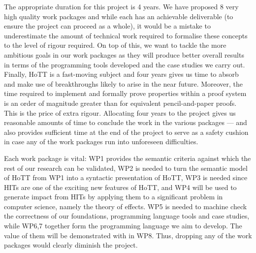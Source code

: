 \documentclass[a4paper,11pt]{article}
\begin{document}
 The appropriate duration for
this project is 4 years. We have proposed 8 very high quality work
packages and while each has an achievable deliverable
(to ensure the project can proceed as a whole), it would be a mistake
to underestimate the amount of technical work required to formalise
these concepts to the level of rigour required. On top of this, we
want to tackle the more ambitious goals in our work packages as they
will produce better overall results in terms of the programming tools
developed and the case studies we carry out. Finally, HoTT is a
fast-moving subject and four years gives us time to absorb and make use
of breakthroughs likely to arise in the near future.  Moreover, the
time required to implement and formally prove properties within a
proof system is an order of magnitude greater than for equivalent
pencil-and-paper proofs. This is the price of extra rigour. Allocating
four years to the project gives us reasonable amounts of time to conclude
the work in the various packages --- and also provides sufficient time
at the end of the project to serve as a safety cushion in case any of
the work packages run into unforeseen difficulties.


\noindent Each work package is vital: WP1 provides
the semantic criteria against which the rest of our
research can be validated, WP2 is needed to turn the semantic model of
HoTT from WP1 into a syntactic presentation of HoTT, WP3 is needed
since HITs are one of the exciting new features of HoTT, and WP4 will
be used to generate impact from HITs by applying them to a significant
problem in computer science, namely the theory of effects. WP5 is
needed to machine check the correctness of our foundations,
programming language tools and case studies, while WP6,7
together form the programming language we aim to develop. The
value of them will be demonstrated with in WP8.
Thus, dropping any of the work packages would clearly diminish the
project.

\vspace{0.02in}
\end{document}
